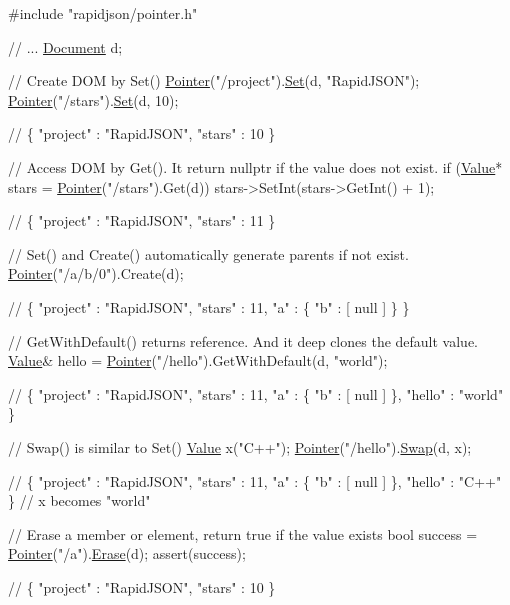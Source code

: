 \begin{DoxyCode}
\textcolor{preprocessor}{#include "rapidjson/pointer.h"}

\textcolor{comment}{// ...}
\hyperlink{class_generic_document}{Document} d;

\textcolor{comment}{// Create DOM by Set()}
\hyperlink{class_generic_pointer}{Pointer}(\textcolor{stringliteral}{"/project"}).\hyperlink{class_generic_pointer_adf0aa776e072b41d301e2a834ac2c2b5}{Set}(d, \textcolor{stringliteral}{"RapidJSON"});
\hyperlink{class_generic_pointer}{Pointer}(\textcolor{stringliteral}{"/stars"}).\hyperlink{class_generic_pointer_adf0aa776e072b41d301e2a834ac2c2b5}{Set}(d, 10);

\textcolor{comment}{// \{ "project" : "RapidJSON", "stars" : 10 \}}

\textcolor{comment}{// Access DOM by Get(). It return nullptr if the value does not exist.}
\textcolor{keywordflow}{if} (\hyperlink{class_generic_value}{Value}* stars = \hyperlink{class_generic_pointer}{Pointer}(\textcolor{stringliteral}{"/stars"}).Get(d))
    stars->SetInt(stars->GetInt() + 1);

\textcolor{comment}{// \{ "project" : "RapidJSON", "stars" : 11 \}}

\textcolor{comment}{// Set() and Create() automatically generate parents if not exist.}
\hyperlink{class_generic_pointer}{Pointer}(\textcolor{stringliteral}{"/a/b/0"}).Create(d);

\textcolor{comment}{// \{ "project" : "RapidJSON", "stars" : 11, "a" : \{ "b" : [ null ] \} \}}

\textcolor{comment}{// GetWithDefault() returns reference. And it deep clones the default value.}
\hyperlink{class_generic_value}{Value}& hello = \hyperlink{class_generic_pointer}{Pointer}(\textcolor{stringliteral}{"/hello"}).GetWithDefault(d, \textcolor{stringliteral}{"world"});

\textcolor{comment}{// \{ "project" : "RapidJSON", "stars" : 11, "a" : \{ "b" : [ null ] \}, "hello" : "world" \}}

\textcolor{comment}{// Swap() is similar to Set()}
\hyperlink{class_generic_value}{Value} x(\textcolor{stringliteral}{"C++"});
\hyperlink{class_generic_pointer}{Pointer}(\textcolor{stringliteral}{"/hello"}).\hyperlink{class_generic_pointer_a25a063290bcf607694430d6b05ac9157}{Swap}(d, x);

\textcolor{comment}{// \{ "project" : "RapidJSON", "stars" : 11, "a" : \{ "b" : [ null ] \}, "hello" : "C++" \}}
\textcolor{comment}{// x becomes "world"}

\textcolor{comment}{// Erase a member or element, return true if the value exists}
\textcolor{keywordtype}{bool} success = \hyperlink{class_generic_pointer}{Pointer}(\textcolor{stringliteral}{"/a"}).\hyperlink{class_generic_pointer_aa8fd4b1259fc500188f4162571b280ec}{Erase}(d);
assert(success);

\textcolor{comment}{// \{ "project" : "RapidJSON", "stars" : 10 \}}
\end{DoxyCode}
